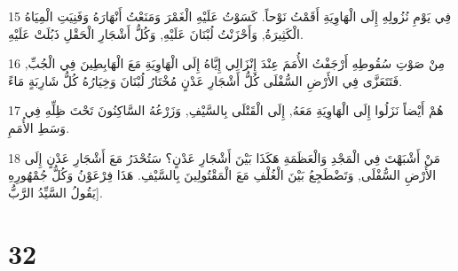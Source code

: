 \par 15 فِي يَوْمِ نُزُولِهِ إِلَى الْهَاوِيَةِ أَقَمْتُ نَوْحاً. كَسَوْتُ عَلَيْهِ الْغَمْرَ وَمَنَعْتُ أَنْهَارَهُ وَفَنِيَتِ الْمِيَاهُ الْكَثِيرَةُ, وَأَحْزَنْتُ لُبْنَانَ عَلَيْهِ, وَكُلُّ أَشْجَارِ الْحَقْلِ ذَبُلَتْ عَلَيْهِ.
\par 16 مِنْ صَوْتِ سُقُوطِهِ أَرْجَفْتُ الأُمَمَ عِنْدَ إِنْزَالِي إِيَّاهُ إِلَى الْهَاوِيَةِ مَعَ الْهَابِطِينَ فِي الْجُبِّ, فَتَتَعَزَّى فِي الأَرْضِ السُّفْلَى كُلُّ أَشْجَارِ عَدْنٍ مُخْتَارُ لُبْنَانَ وَخِيَارُهُ كُلُّ شَارِبَةٍ مَاءً.
\par 17 هُمْ أَيْضاً نَزَلُوا إِلَى الْهَاوِيَةِ مَعَهُ, إِلَى الْقَتْلَى بِالسَّيْفِ, وَزَرْعُهُ السَّاكِنُونَ تَحْتَ ظِلِّهِ فِي وَسَطِ الأُمَمِ.
\par 18 مَنْ أَشْبَهْتَ فِي الْمَجْدِ وَالْعَظَمَةِ هَكَذَا بَيْنَ أَشْجَارِ عَدْنٍ؟ سَتُحْدَرُ مَعَ أَشْجَارِ عَدْنٍ إِلَى الأَرْضِ السُّفْلَى, وَتَضْطَجِعُ بَيْنَ الْغُلْفِ مَعَ الْمَقْتُولِينَ بِالسَّيْفِ. هَذَا فِرْعَوْنُ وَكُلُّ جُمْهُورِهِ يَقُولُ السَّيِّدُ الرَّبُّ].

\chapter{32}

